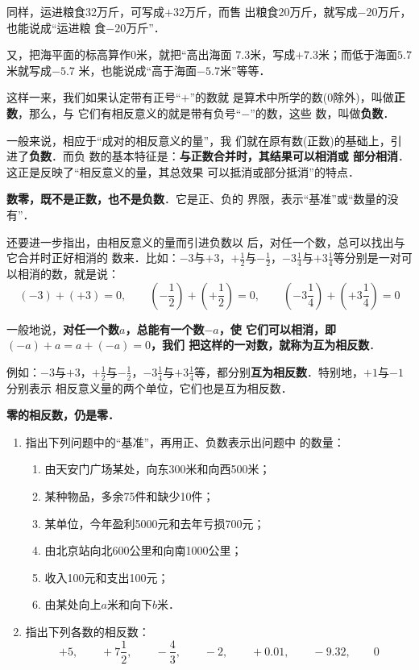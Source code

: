 同样，运进粮食32万斤，可写成$+32$万斤，而售
出粮食20万斤，就写成$-20$万斤，也能说成“运进粮
食$-20$万斤”．

    又，把海平面的标高算作0米，就把“高出海面
7.3米，写成$+7. 3$米；而低于海面$5.7$米就写成$-5.7$
米，也能说成“高于海面$-5. 7$米”等等．

    这样一来，我们如果认定带有正号“$+$”的数就
是算术中所学的数(0除外)，叫做\textbf{正数}，那么，与
它们有相反意义的就是带有负号“$-$”的数，这些
数，叫做\textbf{负数}．

    一般来说，相应于“成对的相反意义的量”，我
们就在原有数(正数)的基础上，引进了\textbf{负数}．而负
数的基本特征是：\textbf{与正数合并时，其结果可以相消或
部分相消}．这正是反映了“相反意义的量，其总效果
可以抵消或部分抵消”的特点．

\textbf{数零，既不是正数，也不是负数}．它是正、负的
界限，表示“基准”或“数量的没有”．

    还要进一步指出，由相反意义的量而引进负数以
后，对任一个数，总可以找出与它合并时正好相消的
数来．比如：$-3$与$+3$，$+\frac{1}{2}$与$-\frac{1}{2}$，$-3\frac{1}{4}$与$+3\frac{1}{4}$等分别是一对可以相消的数，就是说：
\[(-3)+(+3)=0,\qquad \left(-\frac{1}{2}\right)+\left(+\frac{1}{2}\right)=0,\qquad \left(-3\frac{1}{4}\right)+\left(+3\frac{1}{4}\right)=0 \]

一般地说，\textbf{对任一个数$a$，总能有一个数$-a$，使
它们可以相消，即$(-a) +a=a+ (-a) = 0$，我们
把这样的一对数，就称为互为相反数}．

例如：$-3$与$+3$，$+\frac{1}{2}$与$-\frac{1}{2}$，$-3\frac{1}{4}$与$+3\frac{1}{4}$等，都分别\textbf{互为相反数}．特别地，$+1$与$-1$分别表示
相反意义量的两个单位，它们也是互为相反数．

\textbf{零的相反数，仍是零．}

\begin{ex}
 \begin{enumerate}
     \item 指出下列问题中的“基准”，再用正、负数表示出问题中
     的数量：
     \begin{enumerate}
         \item 由天安门广场某处，向东300米和向西500米；
         \item 某种物品，多余75件和缺少10件；
         \item 某单位，今年盈利5000元和去年亏损700元；
         \item 由北京站向北600公里和向南1000公里；
         \item 收入100元和支出100元；
         \item 由某处向上$a$米和向下$b$米．
     \end{enumerate}

       \item 指出下列各数的相反数：
   \[+5,\qquad +7\frac{1}{2},\qquad -\frac{4}{3},\qquad -2,\qquad +0.01,\qquad -9.32,\qquad 0 \]
 \end{enumerate}   
\end{ex}

